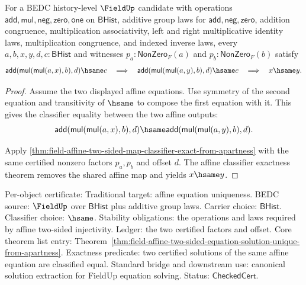 \begin{theorem}
\label{thm:field-affine-two-sided-equation-solution-unique-from-apartness}
For a BEDC history-level $\FieldUp$ candidate with operations
$\mathsf{add},\mathsf{mul},\mathsf{neg},\mathsf{zero},\mathsf{one}$ on
$\mathsf{BHist}$, additive group laws for
$\mathsf{add},\mathsf{neg},\mathsf{zero}$, addition congruence,
multiplication associativity, left and right multiplicative identity laws,
multiplication congruence, and indexed inverse laws, every
$a,b,x,y,d,c:\mathsf{BHist}$ and witnesses
$p_a:\mathsf{NonZero}_F(a)$ and $p_b:\mathsf{NonZero}_F(b)$ satisfy
$$
\mathsf{add}(\mathsf{mul}(\mathsf{mul}(a,x),b),d)\hsame c
\quad\Longrightarrow\quad
\mathsf{add}(\mathsf{mul}(\mathsf{mul}(a,y),b),d)\hsame c
\quad\Longrightarrow\quad
x\hsame y.
$$
\end{theorem}
\begin{proof}
Assume the two displayed affine equations. Use symmetry of the second equation
and transitivity of $\hsame$ to compose the first equation with it. This gives
the classifier equality between the two affine outputs:
$$
\mathsf{add}(\mathsf{mul}(\mathsf{mul}(a,x),b),d)\hsame
\mathsf{add}(\mathsf{mul}(\mathsf{mul}(a,y),b),d).
$$

Apply \autoref{thm:field-affine-two-sided-map-classifier-exact-from-apartness}
with the same certified nonzero factors $p_a,p_b$ and offset $d$. The affine
classifier exactness theorem removes the shared affine map and yields
$x\hsame y$.
\end{proof}

Per-object certificate: Traditional target: affine equation uniqueness. BEDC
source: $\FieldUp$ over $\mathsf{BHist}$ plus additive group laws. Carrier
choice: $\mathsf{BHist}$. Classifier choice: $\hsame$. Stability obligations:
the operations and laws required by affine two-sided injectivity. Ledger: the
two certified factors and offset. Core theorem list entry:
Theorem~\ref{thm:field-affine-two-sided-equation-solution-unique-from-apartness}.
Exactness predicate: two certified solutions of the same affine equation are
classified equal. Standard bridge and downstream use: canonical solution
extraction for FieldUp equation solving. Status: $\mathsf{CheckedCert}$.
